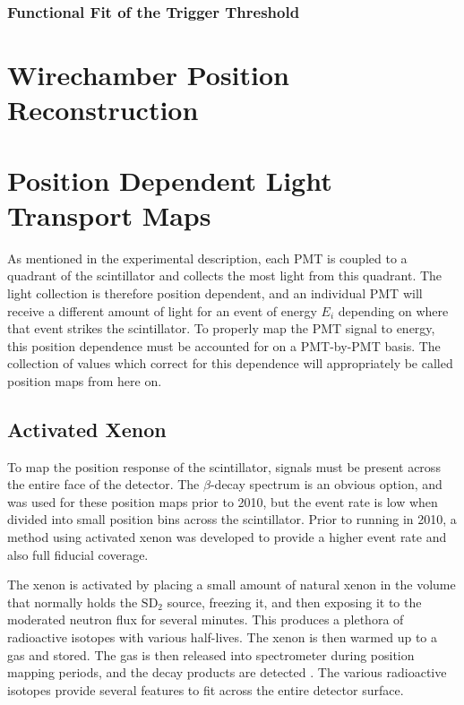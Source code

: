 \subsubsection{Functional Fit of the Trigger Threshold}




\section{Wirechamber Position Reconstruction}



\section{Position Dependent Light Transport Maps}

As mentioned in the experimental description, each PMT is coupled to a quadrant of
the scintillator and collects the most light from this quadrant. The light collection
is therefore position dependent, and an individual PMT will receive a different
amount of light for an event of energy $E_i$ depending on where that event strikes
the scintillator. To properly map the PMT signal to energy, this position dependence
must be accounted for on a PMT-by-PMT basis. The collection of values which correct for this
dependence will appropriately be called position maps from here on.


\subsection{Activated Xenon}

To map the position response of the scintillator, signals must be present across the
entire face of the detector. The $\beta$-decay spectrum
is an obvious option, and was used for these position maps prior to 2010,
but the event rate is low when divided into small position bins across the scintillator.
Prior to running in 2010, a method using activated xenon was developed to provide
a higher event rate and also full fiducial coverage.

The xenon is activated by placing a small amount of natural xenon in the volume that
normally holds the $\mathrm{SD}_2$ source, freezing it, and then exposing it to the moderated
neutron flux for several minutes. This produces a plethora of radioactive isotopes
with various half-lives. The xenon is then warmed up to a gas and stored. The gas
is then released into spectrometer during position mapping periods, and the decay products
are detected \cite{mpmThesis}. The various radioactive isotopes provide several features to fit across the entire
detector surface.

